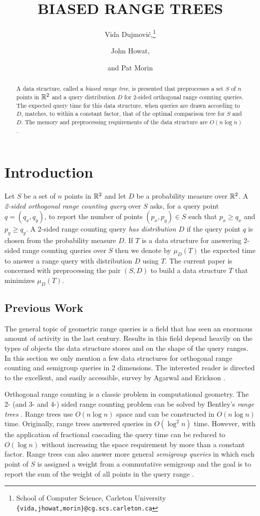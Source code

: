 \documentclass{patmorin}
\title{\MakeUppercase{Biased Range Trees}}
\author{Vida Dujmovi\'c,\thanks{School of Computer Science,
	Carleton University \texttt{\{vida,jhowat,morin\}@cg.scs.carleton.ca}}
	\and John Howat,\footnotemark[1] \and and
	Pat Morin\footnotemark[1]}
\date{}
\begin{document}
\maketitle
\begin{abstract}
A data structure, called a \emph{biased range tree}, is presented that
preprocesses a set $S$ of $n$ points in $\mathbb{R}^2$ and a query
distribution $D$ for 2-sided orthogonal range counting queries.  The
expected query time for this data structure, when queries are drawn
according to $D$, matches, to within a constant factor, that of the
optimal comparison tree for $S$ and $D$.   The memory and preprocessing
requirements of the data structure are $O(n\log n)$.
\end{abstract}

\section{Introduction}

Let $S$ be a set of $n$ points in $\mathbb{R}^2$ and let $D$ be a probability
measure over $\mathbb{R}^2$.  A \emph{2-sided orthogonal range counting query}
over $S$ asks, for a query point $q=(q_x,q_y)$, to report the number
of points $(p_x,p_y)\in S$ such that $p_x \ge q_x$ and $p_y \ge q_y$.
A 2-sided range counting query \emph{has distribution $D$} if the
query point $q$ is chosen from the probability measure $D$.  If $T$
is a data structure for answering 2-sided range counting queries over
$S$ then we denote by $\mu_D(T)$ the expected time to answer a range
query with distribution $D$ using $T$.  The current paper is concerned
with preprocessing the pair $(S,D)$ to build a data structure $T$ that
minimizes $\mu_D(T)$.

\subsection{Previous Work}

The general topic of geometric range queries is a field that has seen
an enormous amount of activity in the last century.  Results in this
field depend heavily on the types of objects the data structure stores
and on the shape of the query ranges.  In this section we only mention
a few data structures for orthogonal range counting and semigroup
queries in 2 dimensions.  The interested reader is directed to the
excellent, and easily accessible, survey by Agarwal and Erickson
\cite{ae99}.

Orthogonal range counting is a classic problem in computational geometry.
The 2- (and 3- and 4-) sided range counting problem can be solved by
Bentley's \emph{range trees} \cite{ae42}.  Range trees use $O(n\log
n)$ space and can be constructed in $O(n\log n)$ time.  Originally,
range trees answered queries in $O(\log^2 n)$ time.  However, with the
application of fractional cascading \cite{ae76,ae196} the query time can
be reduced to $O(\log n)$ without increasing the space requirement by
more than a constant factor.  Range trees can also answer more general
\emph{semigroup queries} in which each point of $S$ is assigned a weight
from a commutative semigroup and the goal is to report the sum of the
weight of all points in the query range \cite{ae133,ae292}.
\end{document}
